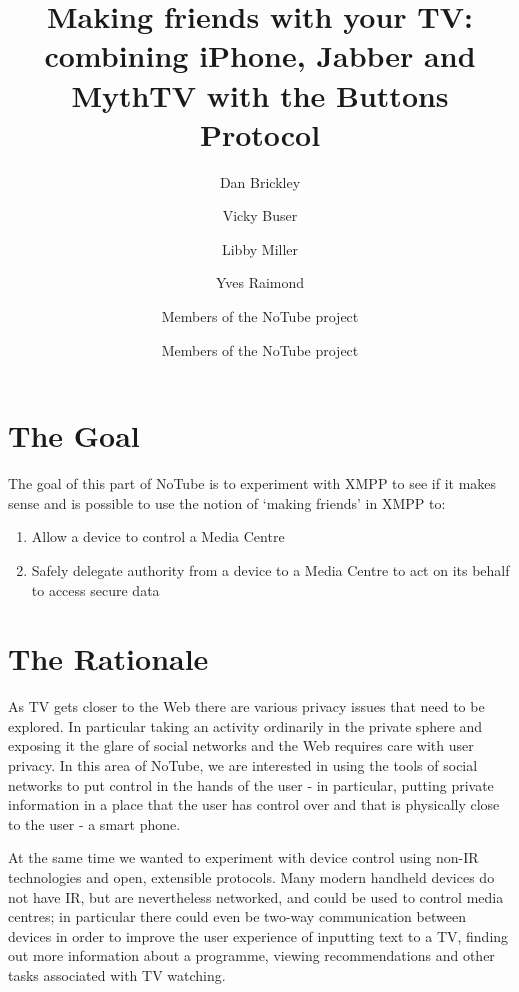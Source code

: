 \documentclass[]{article}
\title{Making friends with your TV: combining iPhone, Jabber and MythTV with the Buttons Protocol}
\author[1]{Dan Brickley}
\author[2]{Vicky Buser}
\author[2]{Libby Miller}
\author[2]{Yves Raimond}
\author[3]{Members of the NoTube project}
\affil[1]{Vrije Universiteit, Amsterdam}
\affil[2]{BBC, UK}
\author[3]{Members of the NoTube project}
\begin{document}
\ifpdf
{}
\else
{}
\fi

\maketitle


\section{The Goal}

The goal of this part of NoTube is to experiment with XMPP to see if it makes sense and is possible to use the notion of `making friends' in XMPP to:

\begin{enumerate}
\item{Allow a device to control a Media Centre}
\item{Safely delegate authority from a device to a Media Centre to act on its behalf to access secure data}
\end{enumerate}

\section{The Rationale}

As TV gets closer to the Web there are various privacy issues that need to be explored. In particular taking an activity ordinarily in the private sphere and exposing it the glare of social networks and the Web requires care with user privacy. In this area of NoTube, we are interested in using the tools of social networks to put control in the hands of the user - in particular, putting private information in a place that the user has control over and that is physically close to the user - a smart phone.

At the same time we wanted to experiment with device control using non-IR technologies and open, extensible protocols. Many modern handheld devices do not have IR, but are nevertheless networked, and could be used to control media centres; in particular there could even be two-way communication between devices in order to improve the user experience of inputting text to a TV, finding out more information about a programme, viewing recommendations and other tasks associated with TV watching.
\end{document}
